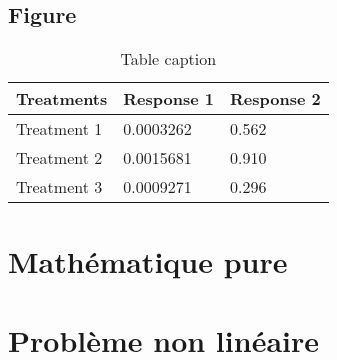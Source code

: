 \documentclass[11pt,fleqn]{book} %
\begin{document}




\section{Figure}

\begin{table}[h]
\centering
\begin{tabular}{l l l}
\toprule
\textbf{Treatments} & \textbf{Response 1} & \textbf{Response 2}\\
\midrule
Treatment 1 & 0.0003262 & 0.562 \\
Treatment 2 & 0.0015681 & 0.910 \\
Treatment 3 & 0.0009271 & 0.296 \\
\bottomrule
\end{tabular}
\caption{Table caption}
\end{table}

%

\chapter{Mathématique pure}


\chapter{Problème non linéaire}


\end{document}
